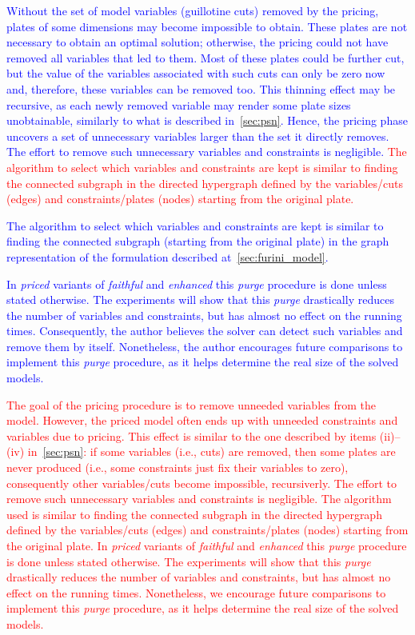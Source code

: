 \documentclass[ppgc,tese,english,formais,babel]{iiufrgs}
\newif\iffinalversion
\newcommand{\newtext}[1]{\iffinalversion%
#1%
\else%
\textcolor{blue}{#1}%
\fi%
}
\newcommand{\oldtext}[1]{\iffinalversion%
\else%
\textcolor{red}{#1}%
\fi%
}
\begin{document}
\newtext{
Without the set of model variables (guillotine cuts) removed by the pricing, plates of some dimensions may become impossible to obtain.
These plates are not necessary to obtain an optimal solution; otherwise, the pricing could not have removed all variables that led to them.
Most of these plates could be further cut, but the value of the variables associated with such cuts can only be zero now and, therefore, these variables can be removed too.
This thinning effect may be recursive, as each newly removed variable may render some plate sizes unobtainable, similarly to what is described in~\cref{sec:psn}.
Hence, the pricing phase uncovers a set of unnecessary variables larger than the set it directly removes.
The effort to remove such unnecessary variables and constraints is negligible.
\oldtext{The algorithm to select which variables and constraints are kept is similar to finding the connected subgraph in the directed hypergraph defined by the variables/cuts (edges) and constraints/plates (nodes) starting from the original plate.}
\newtext{The algorithm to select which variables and constraints are kept is similar to finding the connected subgraph (starting from the original plate) in the graph representation of the formulation described at~\cref{sec:furini_model}.}
In \emph{priced} variants of \emph{faithful} and \emph{enhanced} this \emph{purge} procedure is done unless stated otherwise.
The experiments will show that this \emph{purge} drastically reduces the number of variables and constraints, but has almost no effect on the running times.
Consequently, the author believes the solver can detect such variables and remove them by itself.
Nonetheless, the author encourages future comparisons to implement this \emph{purge} procedure, as it helps determine the real size of the solved models.
}

\oldtext{The goal of the pricing procedure is to remove unneeded variables from the model. However, the priced model often ends up with unneeded constraints and variables due to pricing. This effect is similar to the one described by items (ii)--(iv) in~\autoref{sec:psn}: if some variables (i.e., cuts) are removed, then some plates are never produced (i.e., some constraints just fix their variables to zero), consequently other variables/cuts become impossible, recursiverly. The effort to remove such unnecessary variables and constraints is negligible. The algorithm used is similar to finding the connected subgraph in the directed hypergraph defined by the variables/cuts (edges) and constraints/plates (nodes) starting from the original plate. In \emph{priced} variants of \emph{faithful} and \emph{enhanced} this \emph{purge} procedure is done unless stated otherwise. The experiments will show that this \emph{purge} drastically reduces the number of variables and constraints, but has almost no effect on the running times. Nonetheless, we encourage future comparisons to implement this \emph{purge} procedure, as it helps determine the real size of the solved models.}
\end{document}
